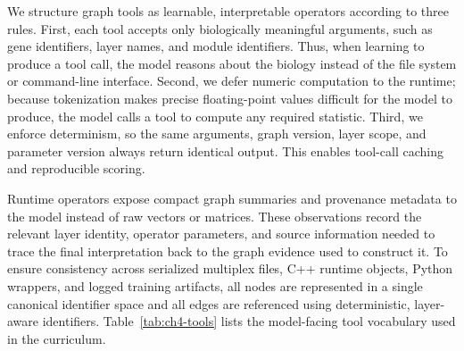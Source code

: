 \documentclass[thesis,letterpaper,12pt]{utthesis}
\begin{document}
We structure graph tools as learnable, interpretable operators according to three rules. First, each tool accepts only biologically meaningful arguments, such as gene identifiers, layer names, and module identifiers. Thus, when learning to produce a tool call, the model reasons about the biology instead of the file system or command-line interface. Second, we defer numeric computation to the runtime; because tokenization makes precise floating-point values difficult for the model to produce, the model calls a tool to compute any required statistic. Third, we enforce determinism, so the same arguments, graph version, layer scope, and parameter version always return identical output. This enables tool-call caching and reproducible scoring.

Runtime operators expose compact graph summaries and provenance metadata to the model instead of raw vectors or matrices. These observations record the relevant layer identity, operator parameters, and source information needed to trace the final interpretation back to the graph evidence used to construct it. To ensure consistency across serialized multiplex files, C++ runtime objects, Python wrappers, and logged training artifacts, all nodes are represented in a single canonical identifier space and all edges are referenced using deterministic, layer-aware identifiers. Table~\ref{tab:ch4-tools} lists the model-facing tool vocabulary used in the curriculum.
\end{document}
